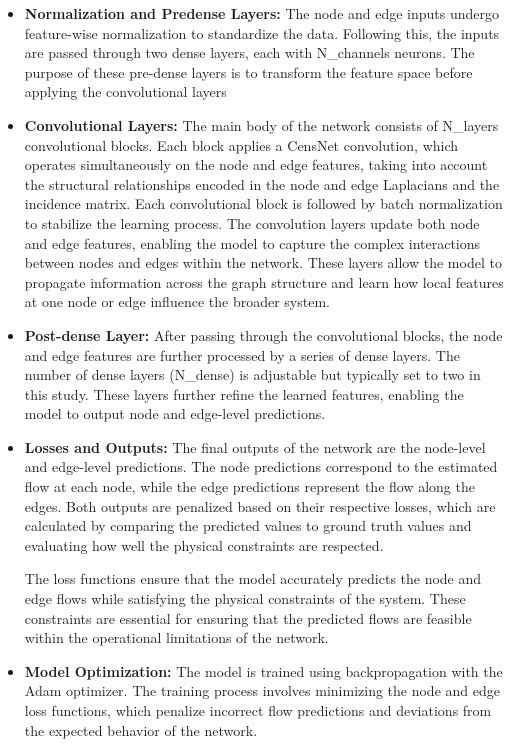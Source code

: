 \begin{itemize}
    \item \textbf{Normalization and Pre\-dense Layers:} The node and edge inputs undergo feature-wise normalization to standardize the data. Following this, the inputs are passed through two dense layers, each with N\_channels neurons. The purpose of these pre-dense layers is to transform the feature space before applying the convolutional layers 
    \item \textbf{Convolutional Layers:} The main body of the network consists of N\_layers convolutional blocks. Each block applies a CensNet convolution, which operates simultaneously on the node and edge features, taking into account the structural relationships encoded in the node and edge Laplacians and the incidence matrix. Each convolutional block is followed by batch normalization to stabilize the learning process. 
 The convolution layers update both node and edge features, enabling the model to capture the complex interactions between nodes and edges within the network. These layers allow the model to propagate information across the graph structure and learn how local features at one node or edge influence the broader system.   
    \item \textbf{Post-dense Layer:} After passing through the convolutional blocks, the node and edge features are further processed by a series of dense layers. The number of dense layers (N\_dense) is adjustable but typically set to two in this study. These layers further refine the learned features, enabling the model to output node and edge-level predictions. 
    \item \textbf{Losses and Outputs:} The final outputs of the network are the node-level and edge-level predictions. The node predictions correspond to the estimated flow at each node, while the edge predictions represent the flow along the edges. Both outputs are penalized based on their respective losses, which are calculated by comparing the predicted values to ground truth values and evaluating how well the physical constraints are respected.

The loss functions ensure that the model accurately predicts the node and edge flows while satisfying the physical constraints of the system. These constraints are essential for ensuring that the predicted flows are feasible within the operational limitations of the network. 
    \item \textbf{Model Optimization:} The model is trained using backpropagation with the Adam optimizer. The training process involves minimizing the node and edge loss functions, which penalize incorrect flow predictions and deviations from the expected behavior of the network.

\begin{figure}
    \centering
    \setlength{}        
    \setlength{}
    \resizebox{\figurewidth}{\figureheight}{}
    \caption{}\label{fig:}
\end{figure}




\end{itemize}

